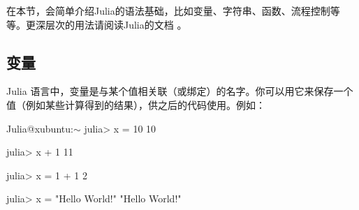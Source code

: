 在本节，会简单介绍Julia的语法基础，比如变量、字符串、函数、流程控制等等。更深层次的用法请阅读Julia的文档 。

\subsection{变量}\label{sec1-3-1}

Julia 语言中，变量是与某个值相关联（或绑定）的名字。你可以用它来保存一个值（例如某些计算得到的结果），供之后的代码使用。例如：

\begin{GitExampla}{Julia@xubuntu:$\sim$}
    julia> x = 10
    10

    julia> x + 1
    11

    julia> x = 1 + 1
    2

    julia> x = "Hello World!"
    "Hello World!"
\end{GitExampla}
